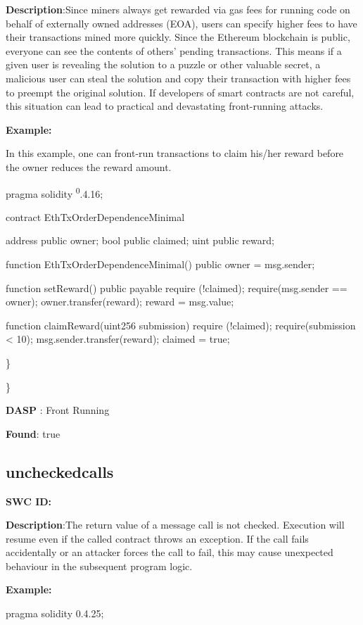 \documentclass{article}
\begin{document}
\textbf{Description}:Since miners always get rewarded via gas fees for running code on behalf of externally owned addresses (EOA), users can specify higher fees to have their transactions mined more quickly. Since the Ethereum blockchain is public, everyone can see the contents of others' pending transactions. This means if a given user is revealing the solution to a puzzle or other valuable secret, a malicious user can steal the solution and copy their transaction with higher fees to preempt the original solution. If developers of smart contracts are not careful, this situation can lead to practical and devastating front-running attacks.


\textbf{Example:} 

In this example, one can front-run transactions to claim his/her reward before the owner reduces the reward amount.

pragma solidity \textsuperscript0.4.16;

contract EthTxOrderDependenceMinimal {
    address public owner;
    bool public claimed;
    uint public reward;

    function EthTxOrderDependenceMinimal() public {
        owner = msg.sender;
    }

    function setReward() public payable {
        require (!claimed);
        require(msg.sender == owner);
        owner.transfer(reward);
        reward = msg.value;
    }

    function claimReward(uint256 submission) {
        require (!claimed);
        require(submission < 10);
        msg.sender.transfer(reward);
        claimed = true;
    }
}

\} 

\} 

\textbf{DASP} : Front Running

\textbf{Found}: true

\subsection{unchecked\textunderscore calls} 
\textbf{SWC \textunderscore ID:} 

\textbf{Description}:The return value of a message call is not checked. Execution will resume even if the called contract throws an exception. If the call fails accidentally or an attacker forces the call to fail, this may cause unexpected behaviour in the subsequent program logic.


\textbf{Example:} 

pragma solidity 0.4.25;
\end{document}
